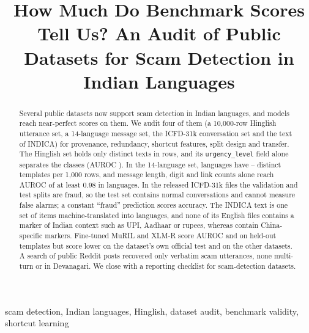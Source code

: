 \documentclass[conference]{IEEEtran}
\begin{document}
\title{How Much Do Benchmark Scores Tell Us? An Audit of Public Datasets for Scam Detection in Indian Languages}

\author{
}

\maketitle

\begin{abstract}
Several public datasets now support scam detection in Indian languages, and models reach near-perfect scores on them. We audit four of them (a 10{,}000-row Hinglish utterance set, a 14-language message set, the ICFD-31k conversation set and the text of INDICA) for provenance, redundancy, shortcut features, split design and transfer. The Hinglish set holds only \HkUnique{} distinct texts in \HkN{} rows, and its \texttt{urgency\_level} field alone separates the classes (AUROC \HkUrgAuc). In the 14-language set, \HamLowN{} languages have \HamLowMin{}--\HamLowMax{} distinct templates per 1{,}000 rows, and message length, digit and link counts alone reach AUROC of at least 0.98 in \HamTrivHigh{} languages. In the released ICFD-31k files the validation and test splits are \IcfdTeFraud{} fraud, so the test set contains \IcfdTeNormal{} normal conversations and cannot measure false alarms; a constant ``fraud'' prediction scores \IcfdAllFraudAcc{} accuracy. The INDICA text is one set of \InN{} items machine-translated into \InLangs{} languages, and none of its \InFiles{} English files contains a marker of Indian context such as UPI, Aadhaar or rupees, whereas \InChinaPct{} contain China-specific markers. Fine-tuned MuRIL and XLM-R score AUROC \MuHamIid{} and \XlHamIid{} on held-out templates but score lower on the dataset's own official test and on the other datasets. A search of \RdScanned{} public Reddit posts recovered only \RdVerb{} verbatim scam utterances, none multi-turn or in Devanagari. We close with a reporting checklist for scam-detection datasets.
\end{abstract}

\begin{IEEEkeywords}
scam detection, Indian languages, Hinglish, dataset audit, benchmark validity, shortcut learning
\end{IEEEkeywords}
\end{document}
